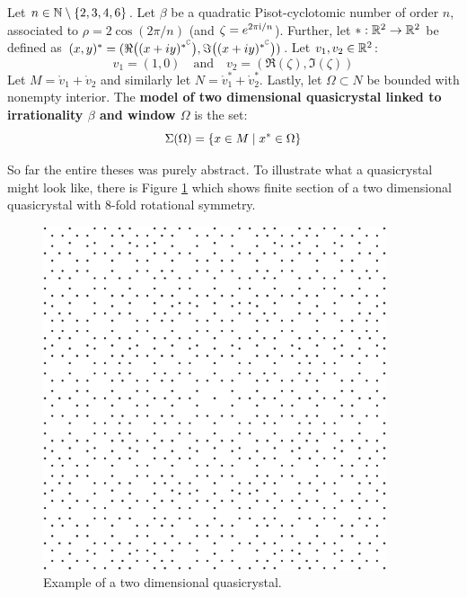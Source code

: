 \documentclass[text.tex]{subfiles}
\begin{document}
\begin{definition}\label{def_quasicrystal}
Let $n\in\mathbb{N}\setminus\{2,3,4,6\}$. Let $\beta$ be a quadratic Pisot-cyclotomic number of order $n$, associated to $\rho = 2\cos\left(2\pi/n\right)$ (and $\zeta = e^{2\pi \mathrm{i}/n}$). 
Further, let $\ast:\mathbb{R}^2\to\mathbb{R}^2$ be defined as $(x,y)^\ast = (\Re{\big((x+iy)^{\ast^{\mathbb{C}}}\big)}, \Im{\big((x+iy)^{\ast^{\mathbb{C}}}\big)})$. 
Let $v_1, v_2\in\mathbb{R}^2$:
$$v_1=(1,0)\quad\text{and}\quad v_2 = (\Re{(\zeta)}, \Im{(\zeta)})$$
Let $M = \ring v_1+\ring v_2$ and similarly let $N = \ring v_1^\ast+\ring v_2^\ast$.
Lastly, let $\Omega\subset N$ be bounded with nonempty interior. 
The \textbf{model of two dimensional quasicrystal linked to irrationality $\beta$ and window $\Omega$} is the set:
$$\Sigma(\Omega) = \{ x \in M\; |\; x^\ast\in \Omega\}$$
\end{definition}

So far the entire theses was purely abstract. To illustrate what a quasicrystal might look like, there is Figure \ref{fig_quasicrystalFirstExample} which shows finite section of a two dimensional quasicrystal with $8$-fold rotational symmetry.

\begin{figure}[h]
\centering
\includegraphics[width=0.9\textwidth]{img/firstExample}
\caption{Example of a two dimensional quasicrystal.}
\label{fig_quasicrystalFirstExample}
\end{figure}
\end{document}
